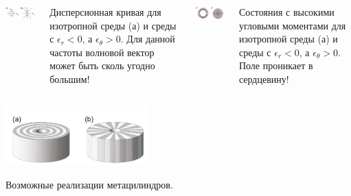\documentclass[9pt, compress, xcolor=table]{beamer}
\begin{document}
\begin{frame}{}
\begin{columns}[c]

\column{6cm}
\begin{center}
\includegraphics[width=5.5cm]{neg_ref_44}
\end{center}
{\tiny Дисперсионная кривая для изотропной среды (а) и среды с $\epsilon_r<0$, а
$\epsilon_{\theta}>0$.  Для данной частоты волновой вектор может быть сколь угодно большим!}

\column{6cm}
\begin{center}
\includegraphics[width=5.5cm]{neg_ref_45}
\end{center}

{\tiny Состояния с высокими угловыми моментами для изотропной среды (а) и среды с $\epsilon_r<0$, а
$\epsilon_{\theta}>0$. Поле проникает в сердцевину!}

\end{columns}

\begin{center}
\includegraphics[width=5.5cm]{neg_ref_46}
\end{center}

{\tiny Возможные реализации метацилиндров.}

\end{frame}
\end{document}
